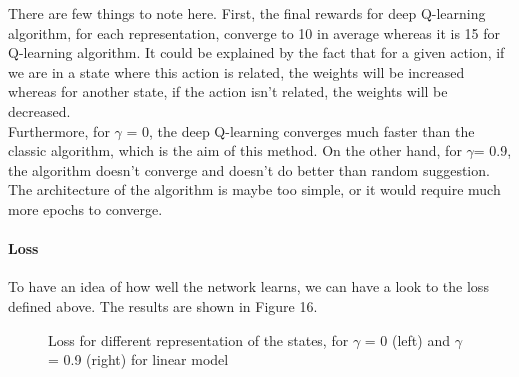 \documentclass[a4paper]{article}
\begin{document}
            There are few things to note here. First, the final rewards for deep Q-learning algorithm, for each representation, converge to 10 in average whereas it is 15 for Q-learning algorithm. It could be explained by the fact that for a given action, if we are in a state where this action is related, the weights will be increased whereas for another state, if the action isn't related, the weights will be decreased. \\
            Furthermore, for $\gamma$ = 0, the deep Q-learning converges much faster than the classic algorithm, which is the aim of this method. On the other hand, for $\gamma $= 0.9, the algorithm doesn't converge and doesn't do better than random suggestion. The architecture of the algorithm is maybe too simple, or it would require much more epochs to converge.

        \paragraph{Loss}
        To have an idea of how well the network learns, we can have a look to the loss defined above. The results are shown in Figure 16. 
        \newpage
        
        \begin{figure}[h!]
        \centering
        \qquad
        \caption{Loss for different representation of the states, for $\gamma$ = 0 (left) and $\gamma $= 0.9 (right) for linear model}%
        \label{fig:example}%
        \end{figure}
        
\end{document}
